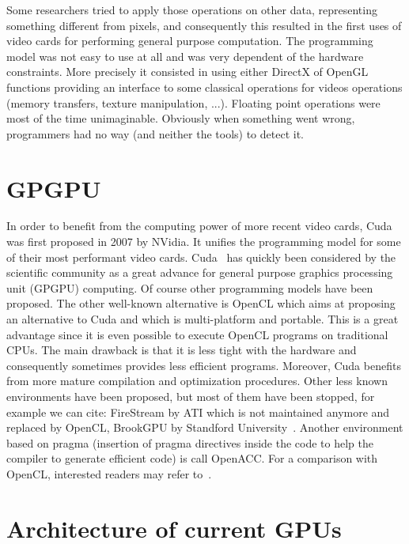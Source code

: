 Some researchers  tried to  apply those operations  on other  data, representing
something different  from pixels,  and consequently this  resulted in  the first
uses of video cards for  performing general purpose computation. The programming
model  was not  easy  to use  at  all and  was very  dependent  of the  hardware
constraints.   More precisely  it consisted  in using  either DirectX  of OpenGL
functions  providing  an  interface  to  some classical  operations  for  videos
operations  (memory  transfers,  texture  manipulation,  ...).   Floating  point
operations were  most of the  time unimaginable.  Obviously when  something went
wrong, programmers had no way (and neither the tools) to detect it.

\section{GPGPU}

In order  to benefit from the computing  power of more recent  video cards, Cuda
was first proposed in 2007 by  NVidia. It unifies the programming model for some
of  their most performant  video cards.   Cuda~\cite{ch1:cuda} has  quickly been
considered by  the scientific community as  a great advance  for general purpose
graphics processing unit (GPGPU)  computing.  Of course other programming models
have been  proposed. The  other well-known alternative  is OpenCL which  aims at
proposing an alternative to Cuda  and which is multi-platform and portable. This
is a  great advantage since  it is even  possible to execute OpenCL  programs on
traditional CPUs.  The main drawback is that it is less tight with the hardware
and  consequently sometimes  provides  less efficient  programs. Moreover,  Cuda
benefits from  more mature compilation and optimization  procedures.  Other less
known environments  have been proposed, but  most of them have  been stopped, for
example  we can  cite: FireStream  by ATI  which is  not maintained  anymore and
replaced by  OpenCL, BrookGPU by  Standford University~\cite{ch1:Buck:2004:BGS}.
Another environment based  on pragma (insertion of pragma  directives inside the
code to  help the compiler to generate  efficient code) is call  OpenACC.  For a
comparison with OpenCL, interested readers may refer to~\cite{ch1:CMR:12}.



\section{Architecture of current GPUs}

